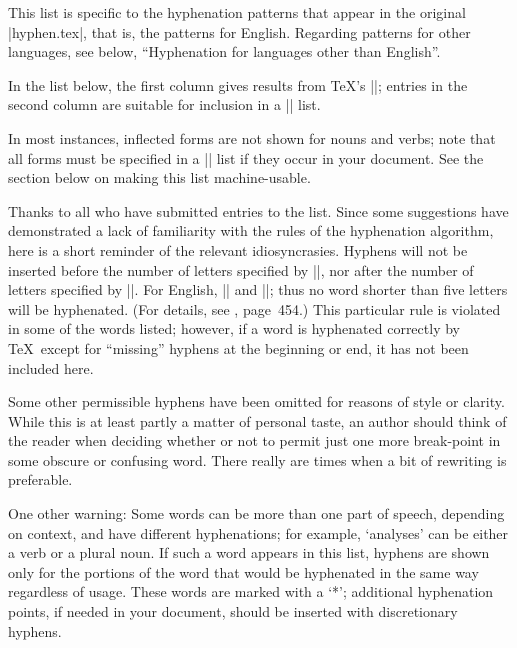 This list is specific to the hyphenation patterns that appear in
the original |hyphen.tex|, that is, the patterns for  English.
Regarding patterns for other languages, see below, ``Hyphenation for
languages other than  English''.

In the list below, the first column gives results from \TeX's
||; entries in the second column are suitable for
inclusion in a || list.

In most instances, inflected forms are not shown for nouns and verbs;
note that all forms must be specified in a || list
if they occur in your document.  See the section below on making this
list machine-usable.

Thanks to all who have submitted entries to the list.  Since some
suggestions have demonstrated a lack of familiarity with the rules of
the hyphenation algorithm, here is a short reminder of the relevant
idiosyncrasies.  Hyphens will not be inserted before the number of
letters specified by |\lefthyphenmin|, nor after the number of letters
specified by |\righthyphenmin|.  For  English, ||
and ||; thus no word shorter than five
letters will be hyphenated.  (For details, see \TB, page~454.)
This particular rule is violated in some of the words
listed; however, if a word is hyphenated correctly by \TeX\ except for
``missing'' hyphens at the beginning or end, it has not been included here.

Some other permissible hyphens have been omitted
for reasons of style or clarity.  While this is at
least partly a matter of personal taste, an author should think of the
reader when deciding whether or not to permit just one more break-point
in some obscure or confusing word.  There really are times when a bit of
rewriting is preferable.

One other warning: Some words can be more than one part of speech,
depending on context, and have different hyphenations; for example,
`analyses' can be either a verb or a plural noun.  If such a word appears
in this list, hyphens are shown only for the portions of the word that
would be hyphenated in the same way regardless of usage.  These words
are marked with a `*'; additional hyphenation points, if needed in your
document, should be inserted with discretionary hyphens.

